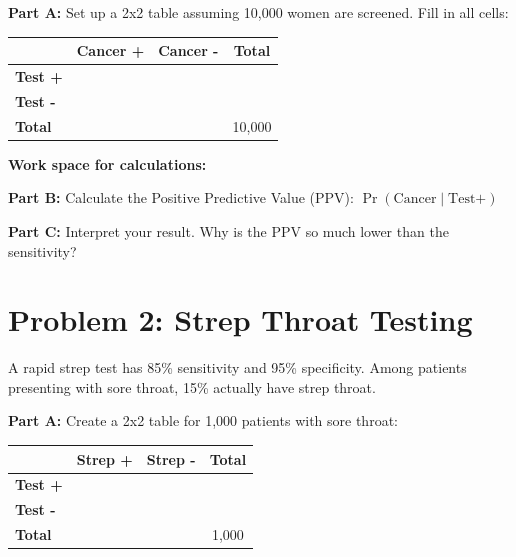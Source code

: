 \documentclass[11pt]{article}
\begin{document}
\vspace{12pt}

\textbf{Part A:} Set up a 2x2 table assuming 10,000 women are screened. Fill in all cells:

\vspace{12pt}

\begin{center}
\begin{tabular}{|l|c|c|c|}
\hline
& \textbf{Cancer +} & \textbf{Cancer -} & \textbf{Total} \\
\hline
\textbf{Test +} & & & \\[2ex]
\hline
\textbf{Test -} & & & \\[2ex]
\hline
\textbf{Total} & & & 10,000 \\[2ex]
\hline
\end{tabular}
\end{center}

\vspace{12pt}

\textbf{Work space for calculations:}

\vspace{4cm}

\textbf{Part B:} Calculate the Positive Predictive Value (PPV): $\Pr(\text{Cancer} \mid \text{Test+})$

\vspace{2cm}

\textbf{Part C:} Interpret your result. Why is the PPV so much lower than the sensitivity?

\vspace{2.5cm}

\newpage

\section{Problem 2: Strep Throat Testing}

A rapid strep test has 85\% sensitivity and 95\% specificity. Among patients presenting with sore throat, 15\% actually have strep throat.

\vspace{12pt}

\textbf{Part A:} Create a 2x2 table for 1,000 patients with sore throat:

\vspace{12pt}

\begin{center}
\begin{tabular}{|l|c|c|c|}
\hline
& \textbf{Strep +} & \textbf{Strep -} & \textbf{Total} \\
\hline
\textbf{Test +} & & & \\[2ex]
\hline
\textbf{Test -} & & & \\[2ex]
\hline
\textbf{Total} & & & 1,000 \\[2ex]
\hline
\end{tabular}
\end{center}
\end{document}
